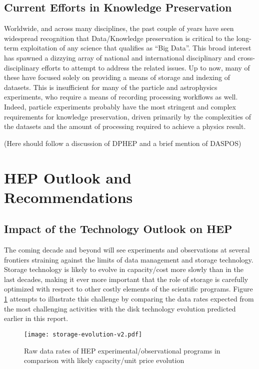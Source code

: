 \subsection{Current Efforts in Knowledge Preservation}
Worldwide, and across many disciplines, the past couple of years have seen widespread 
recognition that Data/Knowledge preservation is critical to the long-term exploitation 
of any science that qualifies as ``Big Data''.  This broad interest has spawned a 
dizzying array of national and international disciplinary and cross-disciplinary 
efforts to attempt to address the related issues.  Up to now, many of these have 
focused solely on providing a means of storage and indexing of datasets.  This is 
insufficient for many of the particle and astrophysics experiments, who require a 
means of recording processing workflows as well.  Indeed, particle experiments 
probably have the most stringent and complex requirements for knowledge 
preservation, driven primarily by the complexities of the datasets and the amount 
of processing required to achieve a physics result.

(Here should follow a discussion of DPHEP and a brief mention of DASPOS)

\section{HEP Outlook and Recommendations}
\label{sec:cpfi5-hep-outlook}
\subsection{Impact of the Technology Outlook on HEP}
The coming decade and beyond will see experiments and observations at several 
frontiers straining against the limits of data management and storage technology.  
Storage technology is likely to evolve in capacity/cost more slowly than in the 
last decades, making it ever more important that the role of storage is carefully 
optimized with respect to other costly elements of the scientific programs.  
Figure \ref{fig:storage-evolution} attempts to illustrate this challenge by comparing the data rates 
expected from the most challenging activities with the disk technology evolution 
predicted earlier in this report.  

\begin{figure}[h]
\centering
\texttt{[image: storage-evolution-v2.pdf]}
\caption{Raw data rates of HEP experimental/observational programs in comparison with likely capacity/unit price evolution}
\label{fig:storage-evolution}
\end{figure}

